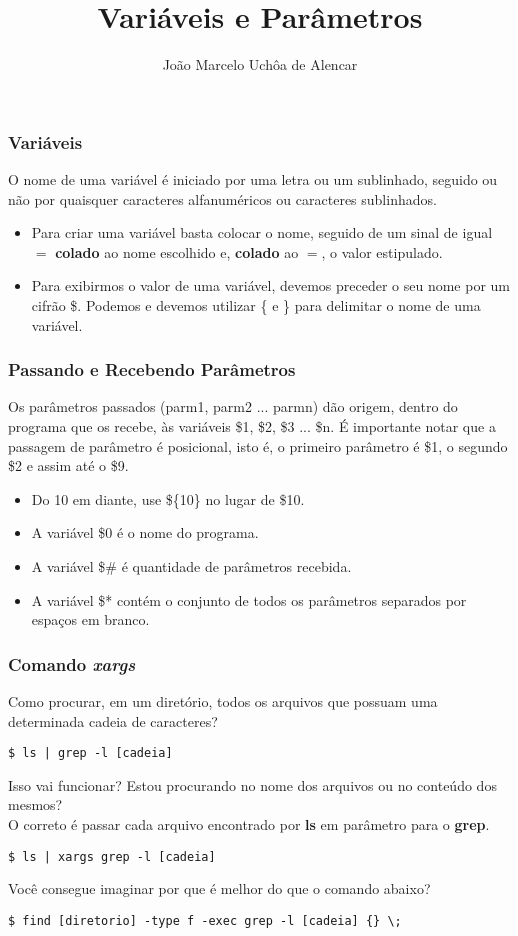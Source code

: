 \documentclass{beamer}
\title{Variáveis e Parâmetros}
\author[João Marcelo Uchôa de Alencar]{João Marcelo Uchôa de Alencar}
\institute{Universidade Federal do Ceará - Quixadá}
\begin{document}
   \begin{frame}
      \titlepage
   \end{frame}

   \begin{frame}
      \frametitle{Variáveis}
      O nome de uma variável é iniciado por uma letra ou um sublinhado, seguido ou não por quaisquer caracteres alfanuméricos ou caracteres sublinhados.
      \begin{itemize}
         \item Para criar uma variável basta colocar o nome, seguido de um sinal de igual $=$ \textbf{colado} ao nome escolhido e, \textbf{colado} ao $=$, o valor estipulado.
	 \item Para exibirmos o valor de uma variável, devemos preceder o seu nome por um cifrão \$. Podemos e devemos utilizar \{ e \} para delimitar o nome de uma variável.
      \end{itemize}
   \end{frame}

   \begin{frame}
      \frametitle{Passando e Recebendo Parâmetros}
      Os parâmetros passados (parm1, parm2 ... parmn) dão origem, dentro do programa que os recebe, às variáveis \$1, \$2, \$3 ... \$n. É importante notar que a passagem de parâmetro é posicional, isto é, o primeiro parâmetro é \$1, o segundo \$2 e assim até o \$9.
      \begin{itemize}
         \item Do 10 em diante, use \$\{10\} no lugar de \$10.
	 \item A variável \$0 é o nome do programa.
	 \item A variável \$\# é quantidade de parâmetros recebida.
	 \item A variável \$* contém o conjunto de todos os parâmetros separados por espaços em branco.
      \end{itemize}
   \end{frame}

\begin{frame}[fragile]
   \frametitle{Comando \textit{xargs}}
   Como procurar, em um diretório, todos os arquivos que possuam uma determinada cadeia de caracteres? 
   \begin{verbatim}	
$ ls | grep -l [cadeia] 
   \end{verbatim}
   Isso vai funcionar? Estou procurando no nome dos arquivos ou no conteúdo dos mesmos? \\
   O correto é passar cada arquivo encontrado por \textbf{ls} em parâmetro para o \textbf{grep}. 
   \begin{verbatim}
$ ls | xargs grep -l [cadeia] 
   \end{verbatim}
   Você consegue imaginar por que é melhor do que o comando abaixo? 
   \begin{verbatim}
$ find [diretorio] -type f -exec grep -l [cadeia] {} \;
   \end{verbatim}
\end{frame}
\end{document}
